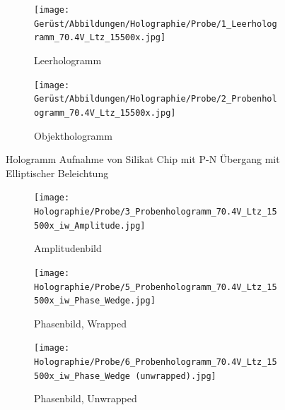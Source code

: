 \begin{figure}[H]
     \centering
     \begin{subfigure}[b]{0.49\textwidth}
         \centering
         \texttt{[image: Gerüst/Abbildungen/Holographie/Probe/1\_Leerhologramm\_70.4V\_Ltz\_15500x.jpg]}
         \caption{Leerhologramm}
         \label{P-NLeerEllip}
     \end{subfigure}
     \hfill
     \begin{subfigure}[b]{0.49\textwidth}
         \centering
         \texttt{[image: Gerüst/Abbildungen/Holographie/Probe/2\_Probenhologramm\_70.4V\_Ltz\_15500x.jpg]}
         \caption{Objekthologramm}
         \label{P-NObjektEllip}
     \end{subfigure}
        \caption{Hologramm Aufnahme von Silikat Chip mit P-N Übergang mit Elliptischer Beleichtung}
        \label{P-NHologrammEllip}
\end{figure}

\begin{figure}
     \centering
     \begin{subfigure}[b]{0.3\textwidth}
         \centering
         \texttt{[image: Holographie/Probe/3\_Probenhologramm\_70.4V\_Ltz\_15500x\_iw\_Amplitude.jpg]}
         \caption{Amplitudenbild}
         \label{P-NAmpEllip}
     \end{subfigure}
     \hfill
     \begin{subfigure}[b]{0.3\textwidth}
         \centering
         \texttt{[image: Holographie/Probe/5\_Probenhologramm\_70.4V\_Ltz\_15500x\_iw\_Phase\_Wedge.jpg]}
         \caption{Phasenbild, Wrapped}
         \label{P-NPhaseWEllip}
     \end{subfigure}
     \hfill
     \begin{subfigure}[b]{0.3\textwidth}
         \centering
         \texttt{[image: Holographie/Probe/6\_Probenhologramm\_70.4V\_Ltz\_15500x\_iw\_Phase\_Wedge (unwrapped).jpg]}
         \caption{Phasenbild, Unwrapped}
         \label{P-NphaseUEllip}
     \end{subfigure}
        \caption{}
        \label{AmpPhaseBildEllip}
\end{figure}